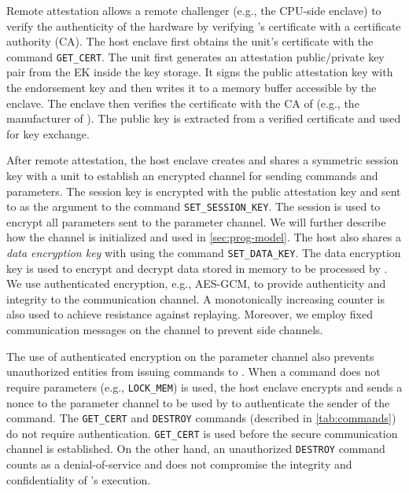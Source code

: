 Remote attestation allows a remote challenger (e.g., the CPU-side enclave) to verify the authenticity of the hardware by verifying \thename's certificate with a certificate authority (CA). The host enclave first obtains the \thename unit's certificate with the command \texttt{GET\_CERT}. The unit first generates an attestation public/private key pair from the EK inside the key storage. It signs the public attestation key with the endorsement key and then writes it to a memory buffer accessible by the enclave. The enclave then verifies the certificate with the CA of \thename (e.g., the manufacturer of \thename). The public key is extracted from a verified certificate and used for key exchange. 


After remote attestation, the host enclave creates and shares a symmetric session key with a \thename unit to establish an encrypted channel for sending commands and parameters. The session key is encrypted with the public attestation key and sent to \thename as the argument to the command \texttt{SET\_SESSION\_KEY}. The session is used to encrypt all parameters sent to the parameter channel. We will further describe how the channel is initialized and used in \cref{sec:prog-model}. The host also shares a \emph{data encryption key} with \thename using the command \texttt{SET\_DATA\_KEY}. The data encryption key is used to encrypt and decrypt data stored in memory to be processed by \thename.  
We use authenticated encryption, e.g., AES-GCM, to provide authenticity and integrity to the communication channel. A monotonically increasing counter is also used to achieve resistance against replaying. Moreover, we employ fixed communication messages on the channel to prevent side channels.

The use of authenticated encryption on the parameter channel also prevents unauthorized entities from issuing commands to \thename. When a command does not require parameters (e.g., \texttt{LOCK\_MEM}) is used, the host enclave encrypts and sends a nonce to the parameter channel to be used by \thename to authenticate the sender of the command. The \texttt{GET\_CERT} and \texttt{DESTROY} commands (described in \autoref{tab:commands}) do not require authentication. \texttt{GET\_CERT} is used before the secure communication channel is established. On the other hand, an unauthorized \texttt{DESTROY} command counts as a denial-of-service and does not compromise the integrity and confidentiality of \thename's execution.

